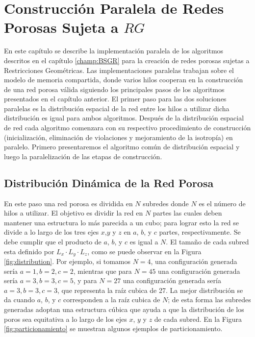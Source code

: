 \chapter[Construcción Paralela]{Construcción Paralela de Redes Porosas Sujeta a $RG$}
\label{champ:PBSGR}
\bigskip
\barra
\bigskip
En este capítulo se describe la implementación paralela de los algoritmos descritos en el capítulo \ref{champ:BSGR} para la creación 
de redes porosas sujetas a Restricciones Geométricas. Las implementaciones paralelas trabajan sobre el modelo  de memoria compartida,
donde varios hilos cooperan en la construcción de una red porosa válida siguiendo los principales pasos de los algoritmos presentados en 
el capítulo anterior. El primer paso para las dos soluciones paralelas es la distribución espacial de la red entre los hilos a utilizar 
dicha distribución es igual para ambos algoritmos. Después de la distribuci\'on espacial de red cada algoritmo comenzara con su 
respectivo procedimiento de construcci\'on (inicializaci\'on, eliminaci\'on de violaciones y mejoramiento de la isotrop\'ia) en paralelo.
Primero presentaremos el algoritmo com\'un de distribución espacial y luego la paralelizaci\'on de las etapas de construcci\'on.

\section{Distribución Dinámica de la Red Porosa}
\label{sec:pdistribution}
En este paso una red porosa es dividida en $N$ subredes donde $N$ es el número de hilos a utilizar. El objetivo es dividir 
la red en $N$ partes las cuales deben mantener una estructura lo más parecida a un cubo; para lograr esto la red se divide a lo largo 
de los tres ejes $x$,$y$ y $z$ en $a$, $b$, y $c$ partes, respectivamente. Se debe cumplir que el producto de  $a$, $b$, y $c$ es igual 
a $N$. El tamaño de cada subred esta definido por $L_x \cdot L_y \cdot L_z$, como se puede observar en la Figura \ref{fig:distribution}. 
Por ejemplo, si tomamos $N=4$, una configuración generada ser\'ia $a=1,b=2,c=2$, mientras que para $N=45$ una configuración generada 
ser\'ia $a=3,b=3,c=5$, y para  $N = 27$ una configuración generada ser\'ia $a=3,b=3,c=3$, que representa la raíz cubica de 27. La mejor 
distribución se da cuando $a$, $b$, y $c$ corresponden a la raíz cubica de $N$; de esta forma las subredes generadas adoptan
una estructura cúbica que ayuda a que la distribución de los poros sea equitativa a lo largo de los ejes $x$, $y$ y $z$ de cada subred.
En la Figura \ref{fig:particionamiento} se muestran algunos ejemplos de particionamiento.\\

